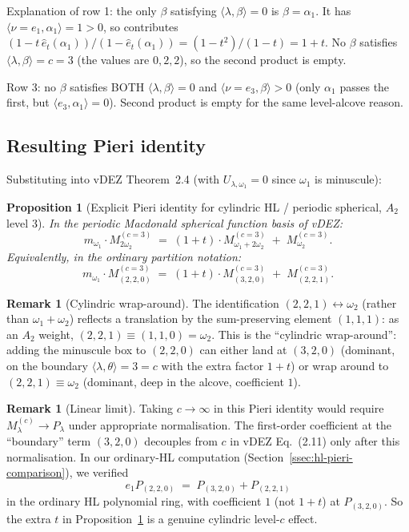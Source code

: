 \documentclass[11pt]{article}
\newtheorem{proposition}[theorem]{Proposition}
\theoremstyle{definition}
\newtheorem{remark}[theorem]{Remark}
\begin{document}
Explanation of row 1: the only $\beta$ satisfying $\langle\lambda,\beta\rangle = 0$ is
$\beta = \alpha_1$. It has $\langle\nu = e_1, \alpha_1\rangle = 1 > 0$, so
contributes $(1 - t\, \hat e_t(\alpha_1))/(1 - \hat e_t(\alpha_1))
= (1 - t^2)/(1-t) = 1+t$. No $\beta$ satisfies $\langle\lambda,\beta\rangle = c = 3$
(the values are $0, 2, 2$), so the second product is empty.

Row 3: no $\beta$ satisfies BOTH $\langle\lambda,\beta\rangle = 0$ and
$\langle\nu = e_3, \beta\rangle > 0$ (only $\alpha_1$ passes the first, but
$\langle e_3, \alpha_1\rangle = 0$). Second product is empty for the same
level-alcove reason.

\subsection{Resulting Pieri identity}

Substituting into vDEZ Theorem~2.4 (with $U_{\lambda,\omega_1} = 0$ since $\omega_1$ is minuscule):

\begin{proposition}[Explicit Pieri identity for cylindric HL / periodic spherical, $A_2$ level 3]
\label{prop:explicit-pieri}
In the periodic Macdonald spherical function basis of vDEZ:
\[
m_{\omega_1}\cdot M^{(c=3)}_{2\omega_2}
\;=\; (1+t)\cdot M^{(c=3)}_{\omega_1 + 2\omega_2}
\;+\; M^{(c=3)}_{\omega_2}.
\]
Equivalently, in the ordinary partition notation:
\[
m_{\omega_1}\cdot M^{(c=3)}_{(2,2,0)}
\;=\; (1+t)\cdot M^{(c=3)}_{(3,2,0)}
\;+\; M^{(c=3)}_{(2,2,1)}.
\]
\end{proposition}

\begin{remark}[Cylindric wrap-around]
The identification $(2,2,1) \leftrightarrow \omega_2$ (rather than
$\omega_1 + \omega_2$) reflects a translation by the sum-preserving element
$(1,1,1)$: as an $A_2$ weight, $(2,2,1) \equiv (1,1,0) = \omega_2$. This is
the ``cylindric wrap-around'': adding the minuscule box to $(2,2,0)$ can
either land at $(3,2,0)$ (dominant, on the boundary $\langle\lambda,\theta\rangle=3=c$
with the extra factor $1+t$) or wrap around to $(2,2,1) \equiv \omega_2$
(dominant, deep in the alcove, coefficient $1$).
\end{remark}

\begin{remark}[Linear limit]
Taking $c \to \infty$ in this Pieri identity would require $M^{(c)}_\lambda \to P_\lambda$
under appropriate normalisation. The first-order coefficient at the ``boundary''
term $(3,2,0)$ decouples from $c$ in vDEZ Eq.~(2.11) only after this
normalisation. In our ordinary-HL computation
(Section~\ref{ssec:hl-pieri-comparison}), we verified
\[
e_1 P_{(2,2,0)} \;=\; P_{(3,2,0)} + P_{(2,2,1)}
\]
in the ordinary HL polynomial ring, with coefficient $1$ (not $1+t$) at
$P_{(3,2,0)}$. So the extra $t$ in Proposition~\ref{prop:explicit-pieri} is
a genuine cylindric level-$c$ effect.
\end{remark}
\end{document}
